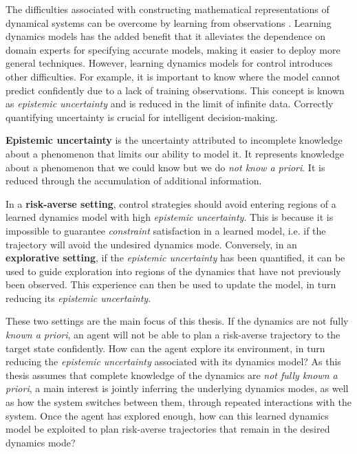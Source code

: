 \documentclass{mimosis-class/mimosis}
\numberwithin{equation}{chapter}
\begin{document}
The difficulties associated with constructing mathematical representations of dynamical systems
can be overcome by learning from observations \citep{ljungSystem1999}.
Learning dynamics models has the added benefit that it
alleviates the dependence on domain experts for specifying accurate models, making it easier to
deploy more general techniques.
However, learning dynamics models for control introduces other difficulties.
For example, it is important to know
where the model cannot predict confidently due to a lack of training observations.
This concept is known as \emph{epistemic uncertainty} and is reduced in the limit of infinite data.
Correctly quantifying uncertainty is crucial for intelligent decision-making.
\begin{myquote}
\textbf{Epistemic uncertainty}
is the uncertainty attributed to incomplete knowledge about a phenomenon that limits our ability to model it.
It represents knowledge about a phenomenon that we could know but we do \textit{not know a priori}.
It is reduced through the accumulation of additional information.
\end{myquote}

In a \textbf{risk-averse setting}, control strategies should avoid entering regions of
a learned dynamics model with high \emph{epistemic uncertainty}.
This is because it is impossible to guarantee \emph{constraint} satisfaction in a learned model, i.e.
if the trajectory will avoid the undesired dynamics mode.
Conversely, in an \textbf{explorative setting},
if the \emph{epistemic uncertainty} has been quantified, it can be used to guide exploration into
regions of the dynamics that have not previously been observed.
This experience can then be used to update the model, in turn reducing its \emph{epistemic uncertainty}.

These two settings are the main focus of this thesis.
If the dynamics are not fully \emph{known a priori}, an agent will not be able to plan a
risk-averse trajectory to the target state confidently.
How can the agent explore its environment, in turn reducing the \emph{epistemic uncertainty}
associated with its dynamics model?
As this thesis assumes that complete knowledge of the dynamics are \emph{not fully known a priori},
a main interest is jointly inferring the underlying dynamics modes, as well as how the system switches
between them, through repeated interactions with the system.
Once the agent has explored enough, how can this learned dynamics model be exploited to plan risk-averse trajectories
that remain in the desired dynamics mode?
\end{document}
